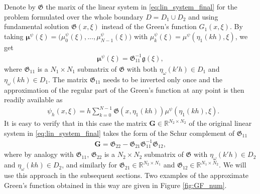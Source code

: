 Denote by $\boldsymbol{\mathfrak{G}}$ the marix of the linear system in \eqref{eq:lin_system_final} for the problem formulated over the whole boundary $D=D_1\cup D_2$ and using fundamental solution $\mathfrak{G}(x,\xi)$ instead of the Green's function $G_1(x,\xi)$.
By taking $\boldsymbol\mu^{\psi}(\xi) = \big( \mu^{\psi}_{0}(\xi), ..., \mu^{\psi}_{N-1}(\xi) \big) $ with $\mu^{\psi}_{k}(\xi) = \mu^{\psi}(\eta_1(kh),\xi)$, we get
\begin{align*}
    \boldsymbol\mu^{\psi}(\xi) = \boldsymbol{\mathfrak{G}}_{11}^{-1} \mathfrak{g}(\xi),
\end{align*}
where $\boldsymbol{\mathfrak{G}}_{11}$ is a $N_1\times N_1$ submatrix of $\boldsymbol{\mathfrak{G}}$ with both $\eta_{\omega}(k'h)\in D_1$ and  $\eta_{\omega}(kh)\in D_1$.
The matrix $\boldsymbol{\mathfrak{G}}_{11}$ needs to be inverted only once and the approximation of the regular part of the Green's function at any point is then readily available as
\begin{align*}
    &\psi_h(x,\xi) 
	= h \sum_{k=0}^{N-1} \mathfrak{G}(x,\eta_1(kh)) \mu^{\psi}(\eta_1(kh),\xi).
\end{align*}
It is easy to verify that in this case the matrix $\mathbf{G}\in\mathbb{R}^{N_2\times N_2}$ of the original linear system in \eqref{eq:lin_system_final} takes the form of the Schur complement of $\boldsymbol{\mathfrak{G}}_{11}$
\begin{align}\label{eq:GF_num_reg_part}
    \boldsymbol{G}
	= \boldsymbol{\mathfrak{G}}_{22} - \boldsymbol{\mathfrak{G}}_{21} \boldsymbol{\mathfrak{G}}_{11}^{-1} \boldsymbol{\mathfrak{G}}_{12},
\end{align}
where by analogy with $\boldsymbol{\mathfrak{G}}_{11}$, $\boldsymbol{\mathfrak{G}}_{22}$ is a $N_2\times N_2$ submatrix of $\boldsymbol{\mathfrak{G}}$ with $\eta_{\omega}(k'h)\in D_2$ and $\eta_{\omega}(kh)\in D_2$, and similarly for $\boldsymbol{\mathfrak{G}}_{21}\in\mathbb{R}^{N_2\times N_1}$ and $\boldsymbol{\mathfrak{G}}_{12}\in\mathbb{R}^{N_1\times N_2}$.
We will use this approach in the subsequent sections.
Two examples of the approximate Green's function obtained in this way are given in Figure \ref{fig:GF_num}.

